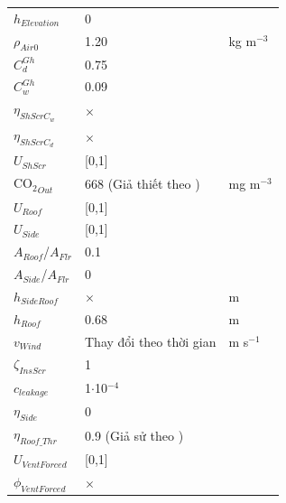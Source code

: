 \documentclass[a4paper]{article}
\begin{document}
\begin{longtable}{l p{} l }
$h_{Elevation}$             & 0                     &                                   \\
$\rho_{Air0}$				& 1.20					& kg m$^{-3}$ 						\\
$C^{Gh}_d$                  & 0.75                  &                                   \\
$C^{Gh}_w$                  & 0.09                  &                                   \\
$\eta_{ShScrC_w}$           & $\times$              &                                   \\
$\eta_{ShScrC_d}$           & $\times$              &                                   \\
$U_{ShScr}$                 & [0,1]                 &                                   \\
$\mathrm{CO_2}_{Out}$       & 668 (Giả thiết theo \cite{vanthoor2011model}) & mg m$^{-3}$\\
$U_{Roof}$                  & [0,1]                 &                                   \\
$U_{Side}$                  & [0,1]                 &                                   \\
$A_{Roof}$/$A_{Flr}$        & 0.1                   &                                   \\
$A_{Side}$/$A_{Flr}$        & 0                     &                                   \\
$h_{SideRoof}$              & $\times$              & m                                 \\
$h_{Roof}$                  & 0.68                  & m                                 \\
$v_{Wind}$                  &Thay đổi theo thời gian& m s$^{-1}$                        \\
$\zeta_{InsScr}$            & 1                     &                                   \\
$c_{leakage}$               & 1$\cdot$10$^{-4}$     &                                   \\
$\eta_{Side}$               & 0                     &                                   \\
$\eta_{Roof\_Thr}$          & 0.9 (Giả sử theo \cite{vanthoor2011model})            &   \\
$U_{VentForced}$            & [0,1]                 &                                   \\
$\phi_{VentForced}$         & $\times$              &                                   \\

\end{longtable}
\end{document}

